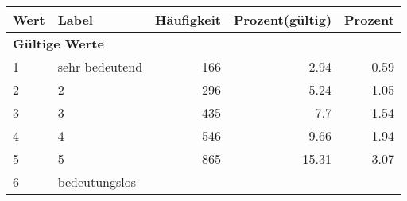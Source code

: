      \begin{longtable}{lXrrr}
     \toprule
     \textbf{Wert} & \textbf{Label} & \textbf{Häufigkeit} & \textbf{Prozent(gültig)} & \textbf{Prozent} \\
     \endhead
     \midrule
     \multicolumn{5}{l}{\textbf{Gültige Werte}}\\

     1 &
     \multicolumn{1}{X}{ sehr bedeutend   } &


       \num{166} &
       \num[round-mode=places,round-precision=2]{2,94} &
         \num[round-mode=places,round-precision=2]{0,59} \\

     2 &
     \multicolumn{1}{X}{ 2   } &


       \num{296} &
       \num[round-mode=places,round-precision=2]{5,24} &
         \num[round-mode=places,round-precision=2]{1,05} \\

     3 &
     \multicolumn{1}{X}{ 3   } &


       \num{435} &
       \num[round-mode=places,round-precision=2]{7,7} &
         \num[round-mode=places,round-precision=2]{1,54} \\

     4 &
     \multicolumn{1}{X}{ 4   } &


       \num{546} &
       \num[round-mode=places,round-precision=2]{9,66} &
         \num[round-mode=places,round-precision=2]{1,94} \\

     5 &
     \multicolumn{1}{X}{ 5   } &


       \num{865} &
       \num[round-mode=places,round-precision=2]{15,31} &
         \num[round-mode=places,round-precision=2]{3,07} \\

     6 &
     \multicolumn{1}{X}{ bedeutungslos   } &



\end{longtable}
